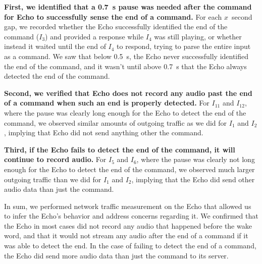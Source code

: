 \textbf{First, we identified that a 0.7~s pause was needed after the command for Echo to successfully sense the end of a command.} For each $x$~second gap, we recorded whether the Echo successfully identified the end of the command ($I_3$) and provided a response while $I_4$ was still playing, or whether instead it waited until the end of $I_4$ to respond, trying to parse the entire input as a command. We saw that below 0.5~s, the Echo never successfully identified the end of the command, and it wasn't until above 0.7~s that the Echo always detected the end of the command.

\textbf{Second, we verified that Echo does not record any audio past the end of a command when such an end is properly detected.} For $I_{11}$ and $I_{12}$, where the pause was clearly long enough for the Echo to detect the end of the command, we observed similar amounts of outgoing traffic as we did for $I_{1}$ and $I_{2}$, implying that Echo did not send anything other the command.

\textbf{Third, if the Echo fails to detect the end of the command, it will continue to record audio.} For $I_{5}$ and $I_{6}$, where the pause was clearly not long enough for the Echo to detect the end of the command, we observed much larger outgoing traffic than we did for $I_{1}$ and $I_{2}$, implying that the Echo did send other audio data than just the command.

In sum, we performed network traffic measurement on the Echo that allowed us to infer the Echo's behavior and address concerns regarding it. We confirmed that the Echo in most cases did not record any audio that happened before the wake word, and that it would not stream any audio after the end of a command if it was able to detect the end. In the case of failing to detect the end of a command, the Echo did send more audio data than just the command to its server.
